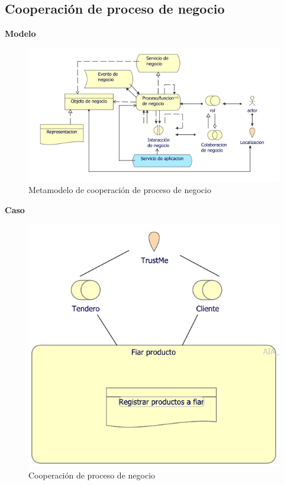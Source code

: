 	\subsection{Cooperación de proceso de negocio}
	{ 
		
		\textbf{Modelo}\\
		\begin{figure}[H]
			\centering
			\includegraphics[width=0.8\linewidth]{development/cooperacionproceso.png}
			\caption{Metamodelo de cooperación de proceso de negocio}
		\end{figure}
		
		\textbf{Caso}\\
		
		
		\begin{figure}[H]
			\centering
			\includegraphics[width=0.8\linewidth]{development/cooperacionproceso.pdf}
			\caption{Cooperación de proceso de negocio}
		\end{figure}
	}
	
